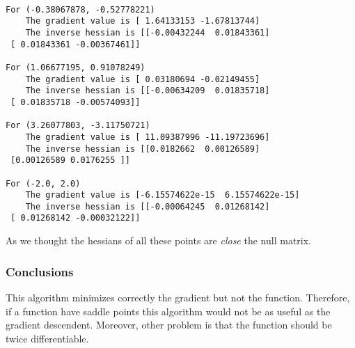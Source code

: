 \begin{verbatim}

For (-0.38067878, -0.52778221)
	The gradient value is [ 1.64133153 -1.67813744]
	The inverse hessian is [[-0.00432244  0.01843361]
 [ 0.01843361 -0.00367461]]

For (1.06677195, 0.91078249)
	The gradient value is [ 0.03180694 -0.02149455]
	The inverse hessian is [[-0.00634209  0.01835718]
 [ 0.01835718 -0.00574093]]

For (3.26077803, -3.11750721)
	The gradient value is [ 11.09387996 -11.19723696]
	The inverse hessian is [[0.0182662  0.00126589]
 [0.00126589 0.0176255 ]]

For (-2.0, 2.0)
	The gradient value is [-6.15574622e-15  6.15574622e-15]
	The inverse hessian is [[-0.00064245  0.01268142]
 [ 0.01268142 -0.00032122]]

\end{verbatim}

As we thought the hessians of all these points are \textit{close} the null matrix.

\subsubsection{Conclusions}

This algorithm minimizes correctly the gradient but not the function. Therefore, if a function have saddle points this algorithm would not be as useful as the gradient descendent. Moreover, other problem is that the function should be twice differentiable. 
 
